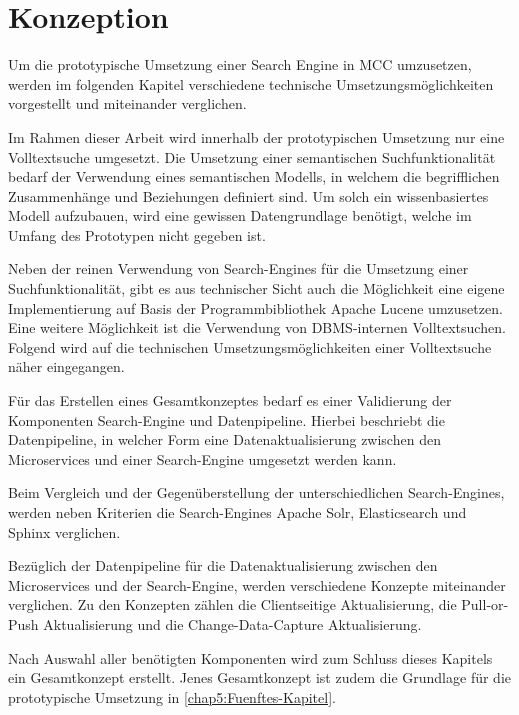 \chapter{Konzeption\label{chap4:Viertes-Kapitel}}

Um die prototypische Umsetzung einer Search Engine in MCC umzusetzen, werden im folgenden Kapitel verschiedene technische Umsetzungsmöglichkeiten vorgestellt und miteinander verglichen.


Im Rahmen dieser Arbeit wird innerhalb der prototypischen Umsetzung nur eine Volltextsuche umgesetzt. Die Umsetzung einer semantischen Suchfunktionalität bedarf der Verwendung eines semantischen Modells, in welchem die begrifflichen Zusammenhänge und Beziehungen definiert sind. Um solch ein wissenbasiertes Modell aufzubauen, wird eine gewissen Datengrundlage benötigt, welche im Umfang des Prototypen nicht gegeben ist.

Neben der reinen Verwendung von Search-Engines für die Umsetzung einer Suchfunktionalität, gibt es aus technischer Sicht auch die Möglichkeit eine eigene Implementierung auf Basis der Programmbibliothek \glqq Apache Lucene\grqq{} umzusetzen. Eine weitere Möglichkeit ist die Verwendung von DBMS-internen Volltextsuchen. Folgend wird auf die technischen Umsetzungsmöglichkeiten einer Volltextsuche näher eingegangen.

Für das Erstellen eines Gesamtkonzeptes bedarf es einer Validierung der Komponenten \glqq Search-Engine\grqq{} und \glqq Datenpipeline\grqq{}. Hierbei beschriebt die Datenpipeline, in welcher Form eine Datenaktualisierung zwischen den Microservices und einer Search-Engine umgesetzt werden kann.

Beim Vergleich und der Gegenüberstellung der unterschiedlichen Search-Engines, werden neben Kriterien die Search-Engines \glqq Apache Solr\grqq{}, \glqq Elasticsearch\grqq{} und \glqq Sphinx\grqq{} verglichen.

Bezüglich der Datenpipeline für die Datenaktualisierung zwischen den Microservices und der Search-Engine, werden verschiedene Konzepte miteinander verglichen. Zu den Konzepten zählen die \glqq Clientseitige Aktualisierung\grqq{}, die \glqq Pull-or-Push Aktualisierung\grqq{} und die \glqq Change-Data-Capture Aktualisierung\grqq{}.

Nach Auswahl aller benötigten Komponenten wird zum Schluss dieses Kapitels ein Gesamtkonzept erstellt. Jenes Gesamtkonzept ist zudem die Grundlage für die prototypische Umsetzung in \autoref{chap5:Fuenftes-Kapitel}.

